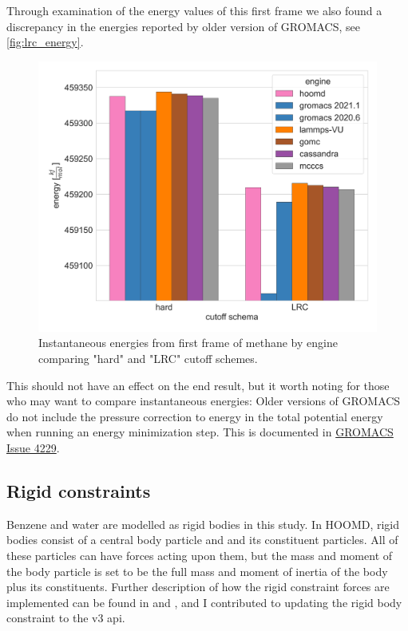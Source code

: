 Through examination of the energy values of this first frame we also found a discrepancy in the energies reported by older version of GROMACS, see \autoref{fig:lrc_energy}.
\begin{figure}[h!]
    \centering
    \includegraphics[width=0.8\linewidth,keepaspectratio]{figures/rep_study/lrc_energy.png}
    \caption{Instantaneous energies from first frame of methane by engine comparing "hard" and "LRC" cutoff schemes.}\label{fig:lrc_energy}
\end{figure}
This should not have an effect on the end result, but it worth noting for those who may want to compare instantaneous energies:
Older versions of GROMACS do not include the pressure correction to energy in the total potential energy when running an energy minimization step. 
This is documented in \href{https://gitlab.com/gromacs/gromacs/-/issues/4229}{GROMACS Issue 4229}.

\subsection{Rigid constraints}

Benzene and water are modelled as rigid bodies in this study.
In HOOMD, rigid bodies consist of a central body particle and and its constituent particles. 
All of these particles can have forces acting upon them, but the mass and moment of the body particle is set to be the full mass and moment of inertia of the body plus its constituents.  
Further description of how the rigid constraint forces are implemented can be found in \citet{Nguyen2011a} and \citet{Glaser2020a}, and I contributed to updating the rigid body constraint to the v3 api.

